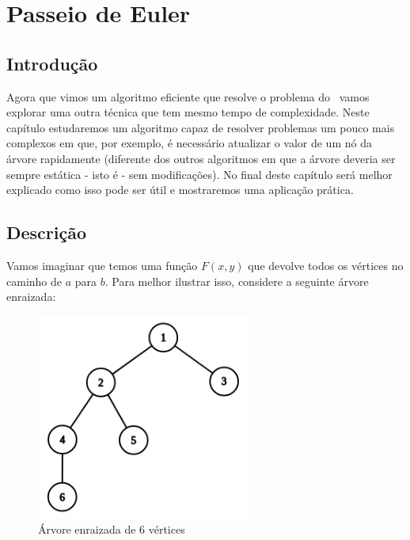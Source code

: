 \chapter{Passeio de Euler}
\label{cap:passeio-euler}

\section{Introdução}

Agora que vimos um algoritmo eficiente que resolve o problema do \LCA\, vamos explorar uma outra técnica que tem mesmo tempo de complexidade. Neste capítulo estudaremos um algoritmo capaz de resolver problemas um pouco mais complexos em que, por exemplo, é necessário atualizar o valor de um nó da árvore rapidamente (diferente dos outros algoritmos em que a árvore deveria ser sempre estática - isto é - sem modificações). No final deste capítulo será melhor explicado como isso pode ser útil e mostraremos uma aplicação prática.


\section{Descrição}

Vamos imaginar que temos uma função $F(x, y)$ que devolve todos os vértices no caminho de $a$ para $b$. Para melhor ilustrar isso, considere a seguinte árvore enraizada:

\vspace{0.5cm}

\begin{figure}[htb]
\begin{center}
\includegraphics[width=7cm]{images/graph_euler.png}
\end{center}
\caption{\label{fig:arvore-euler}Árvore enraizada de 6 vértices}
\end{figure}


